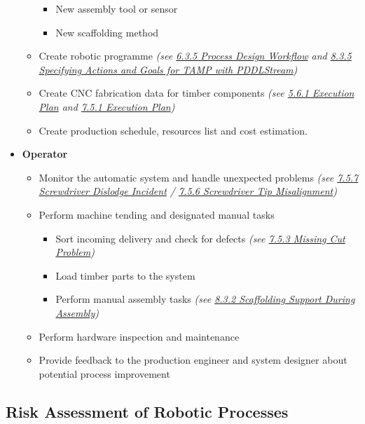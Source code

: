\documentclass[11pt]{book}
\begin{document}
\begin{itemize}
\begin{itemize}
\begin{itemize}
	\item New assembly tool or sensor

	\item New scaffolding method

\end{itemize}
	\item Create robotic programme \textit{(see \uline{6.3.5 Process Design Workflow} and \uline{8.3.5 Specifying Actions and Goals for TAMP with PDDLStream})}

	\item Create CNC fabrication data for timber components \textit{(see \uline{5.6.1 Execution Plan} and \uline{7.5.1 Execution Plan})}

	\item Create production schedule, resources list and cost estimation.

\end{itemize}
	\item \textbf{Operator}

\begin{itemize}
	\item Monitor the automatic system and handle unexpected problems \textit{(see \uline{7.5.7 Screwdriver Dislodge Incident} / \uline{7.5.6 Screwdriver Tip Misalignment})}

	\item Perform machine tending and designated manual tasks 

\begin{itemize}
	\item Sort incoming delivery and check for defects \textit{(see \uline{7.5.3 Missing Cut Problem})}

	\item Load timber parts to the system

	\item Perform manual assembly tasks \textit{(see \uline{8.3.2 Scaffolding Support During Assembly})}

\end{itemize}
	\item Perform hardware inspection and maintenance

	\item Provide feedback to the production engineer and system designer about potential process improvement

\end{itemize}
\end{itemize}
\subsection{Risk Assessment of Robotic Processes}
\end{document}
